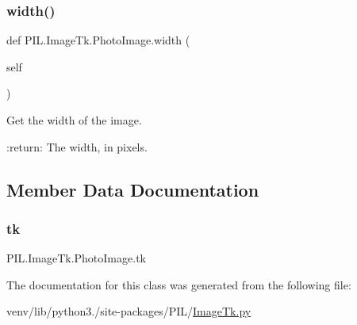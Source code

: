 \subsubsection{\texorpdfstring{width()}{width()}}
{\footnotesize\ttfamily def P\+I\+L.\+Image\+Tk.\+Photo\+Image.\+width (\begin{DoxyParamCaption}\item[{}]{self }\end{DoxyParamCaption})}

\begin{DoxyVerb}Get the width of the image.

:return: The width, in pixels.
\end{DoxyVerb}
 

\subsection{Member Data Documentation}
\mbox{\label{classPIL_1_1ImageTk_1_1PhotoImage_a5c6c5db294abea511bffc966dbae4e74}} 
\subsubsection{\texorpdfstring{tk}{tk}}
{\footnotesize\ttfamily P\+I\+L.\+Image\+Tk.\+Photo\+Image.\+tk}



The documentation for this class was generated from the following file\+:\begin{DoxyCompactItemize}
\item 
venv/lib/python3./site-\/packages/\+P\+I\+L/\hyperlink{ImageTk_8py}{Image\+Tk.\+py}\end{DoxyCompactItemize}
